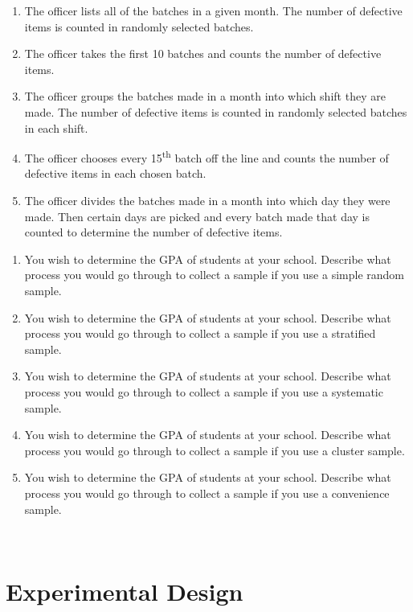 \documentclass[
]{book}
\providecommand{\tightlist}{%
  \setlength{\itemsep}{0pt}\setlength{\parskip}{0pt}}
\begin{document}
\begin{enumerate}
\def\labelenumi{\alph{enumi}.}
\tightlist
\item
  The officer lists all of the batches in a given month. The number of defective items is counted in randomly selected batches.
\item
  The officer takes the first 10 batches and counts the number of defective items.
\item
  The officer groups the batches made in a month into which shift they are made. The number of defective items is counted in randomly selected batches in each shift.
\item
  The officer chooses every 15\textsuperscript{th} batch off the line and counts the number of defective items in each chosen batch.
\item
  The officer divides the batches made in a month into which day they were made. Then certain days are picked and every batch made that day is counted to determine the number of defective items.
\end{enumerate}

\begin{enumerate}
\def\labelenumi{\arabic{enumi}.}
\setcounter{enumi}{2}
\item
  You wish to determine the GPA of students at your school. Describe what process you would go through to collect a sample if you use a simple random sample.
\item
  You wish to determine the GPA of students at your school. Describe what process you would go through to collect a sample if you use a stratified sample.
\item
  You wish to determine the GPA of students at your school. Describe what process you would go through to collect a sample if you use a systematic sample.
\item
  You wish to determine the GPA of students at your school. Describe what process you would go through to collect a sample if you use a cluster sample.
\item
  You wish to determine the GPA of students at your school. Describe what process you would go through to collect a sample if you use a convenience sample.
\end{enumerate}

\textbf{\\
}

\hypertarget{experimental-design}{%
\section{Experimental Design}\label{experimental-design}}
\end{document}

